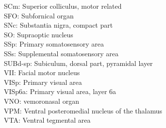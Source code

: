 SCm: Superior colliculus, motor related \\
SFO: Subfornical organ \\
SNc: Substantia nigra, compact part \\
SO: Supraoptic nucleus\\
SSp: Primary somatosensory area \\
SSs: Supplemental somatosensory area \\
SUBd-sp: Subiculum, dorsal part, pyramidal layer\\ 
VII: Facial motor nucleus \\
VISp: Primary visual area \\
VISp6a: Primary visual area, layer 6a\\ 
VNO: vemoronasal organ\\
VPM: Ventral posteromedial nucleus of the thalamus\\ 
VTA: Ventral tegmental area \\








